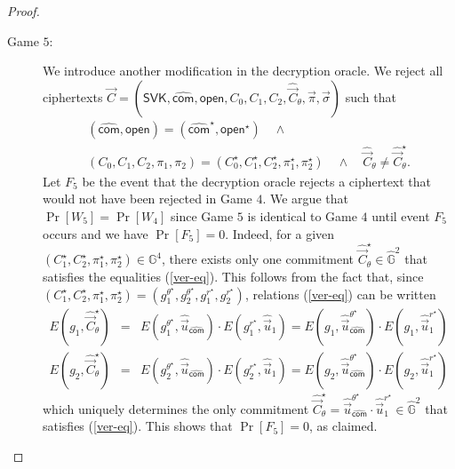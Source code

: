 \documentclass[10pt]{llncs}
\newcommand{\G}{\mathbb{G}}
\newcommand{\SVK}{\mathsf{SVK}}
\newcommand{\com}{\hat{\mathsf{com}}}
\newcommand{\open}{\mathsf{open}}
\begin{document}
\begin{proof}
\begin{description}
  \item[\textsf{Game} $5$:] We introduce another modification in the decryption oracle.  We  reject all ciphertexts $ \vec{C} = (\SVK, \com, \open, C_0, C_1, C_2, \hat{\vec{C}}_{\theta}, \vec{\pi}, \vec{\sigma})  $ 
    such that
    \begin{multline} \label{event-F5}
      (\com,\open)=(\com^\star,\open^\star)  \quad \wedge \quad \\ (C_0,C_1,C_2,\pi_1,\pi_2) = (C_0^\star,C_1^\star,C_2^\star,\pi_1^\star,\pi_2^\star) 
      \quad  \wedge \quad \hat{\vec{C}}_{\theta} \neq \hat{\vec{C}}_{\theta}^\star .
    \end{multline}  
    Let $F_5$ be the event that the decryption oracle rejects a ciphertext that would not have been rejected in Game $4$.   
    We argue that $\Pr[W_5] = \Pr[W_4]$ since Game $5$ is identical to Game $4$ until event $F_5$ occurs and we have $\Pr[F_5]=0$. 
    Indeed, 
    for a given $(C_1^\star,C_2^\star,\pi_1^\star,\pi_2^\star) \in \G^4$, there exists only one commitment $\hat{\vec{C}}_{\theta}^\star \in \hat{\G}^2$ that satisfies the equalities (\ref{ver-eq}). This follows from the fact that, since  
    $(C_1^\star,C_2^\star,\pi_1^\star,\pi_2^\star)=(g_1^{\theta^\star},g_2^{\theta^\star},g_1^{r^\star},g_2^{r^\star})$, relations 
    (\ref{ver-eq}) can be written
    \begin{eqnarray*}  
      E(g_1,\hat{\vec{C}}_{\theta}^\star) &=& E(g_1^{\theta^\star} , \hat{\vec{u}}_{\com}) \cdot E(g_1^{r^\star},\hat{\vec{u}}_1) = E(g_1 , \hat{\vec{u}}_{\com}^{\theta^\star}) \cdot E(g_1,\hat{\vec{u}}_1^{r^\star}) \\ \nonumber
      E(g_2,\hat{\vec{C}}_{\theta}^\star) &=& E(g_2^{\theta^\star} , \hat{\vec{u}}_{\com}) \cdot E(g_2^{r^\star},\hat{\vec{u}}_1) =E(g_2 , \hat{\vec{u}}_{\com}^{\theta^\star}) \cdot E(g_2, \hat{\vec{u}}_1^{r^\star})
    \end{eqnarray*}
    which uniquely determines the  only commitment $\hat{\vec{C}}_{\theta}^\star= \hat{\vec{u}}_{\com}^{\theta^\star} \cdot \hat{\vec{u}}_1^{r^\star} \in \hat{\G}^2$ that satisfies (\ref{ver-eq}). 
    This shows that $\Pr[F_5] = 0$, as claimed. 
    \smallskip \smallskip 






\end{description}
\end{proof}
\end{document}
